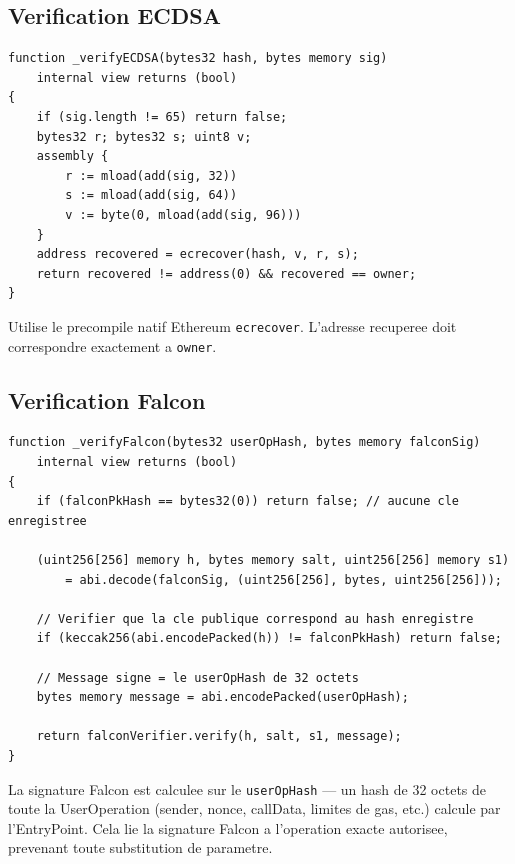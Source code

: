 \documentclass[11pt,a4paper]{article}
\begin{document}
\subsection{Verification ECDSA}

\begin{lstlisting}[style=solidity, caption={\_verifyECDSA}]
function _verifyECDSA(bytes32 hash, bytes memory sig)
    internal view returns (bool)
{
    if (sig.length != 65) return false;
    bytes32 r; bytes32 s; uint8 v;
    assembly {
        r := mload(add(sig, 32))
        s := mload(add(sig, 64))
        v := byte(0, mload(add(sig, 96)))
    }
    address recovered = ecrecover(hash, v, r, s);
    return recovered != address(0) && recovered == owner;
}
\end{lstlisting}

Utilise le precompile natif Ethereum \texttt{ecrecover}. L'adresse recuperee doit correspondre
exactement a \texttt{owner}.

\subsection{Verification Falcon}

\begin{lstlisting}[style=solidity, caption={\_verifyFalcon}]
function _verifyFalcon(bytes32 userOpHash, bytes memory falconSig)
    internal view returns (bool)
{
    if (falconPkHash == bytes32(0)) return false; // aucune cle enregistree

    (uint256[256] memory h, bytes memory salt, uint256[256] memory s1)
        = abi.decode(falconSig, (uint256[256], bytes, uint256[256]));

    // Verifier que la cle publique correspond au hash enregistre
    if (keccak256(abi.encodePacked(h)) != falconPkHash) return false;

    // Message signe = le userOpHash de 32 octets
    bytes memory message = abi.encodePacked(userOpHash);

    return falconVerifier.verify(h, salt, s1, message);
}
\end{lstlisting}

\begin{infobox}
La signature Falcon est calculee sur le \texttt{userOpHash} --- un hash de 32 octets de toute
la UserOperation (sender, nonce, callData, limites de gas, etc.) calcule par l'EntryPoint.
Cela lie la signature Falcon a l'operation exacte autorisee, prevenant toute substitution
de parametre.
\end{infobox}
\end{document}
